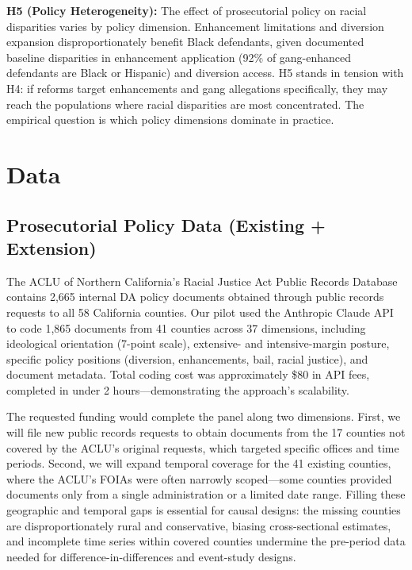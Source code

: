 \documentclass[12pt]{article}
\begin{document}
\textbf{H5 (Policy Heterogeneity):} The effect of prosecutorial policy on racial disparities varies by policy dimension. Enhancement limitations and diversion expansion disproportionately benefit Black defendants, given documented baseline disparities in enhancement application (92\% of gang-enhanced defendants are Black or Hispanic) and diversion access. H5 stands in tension with H4: if reforms target enhancements and gang allegations specifically, they may reach the populations where racial disparities are most concentrated. The empirical question is which policy dimensions dominate in practice.

\section{Data}

\subsection{Prosecutorial Policy Data (Existing + Extension)}

The ACLU of Northern California's Racial Justice Act Public Records Database contains 2,665 internal DA policy documents obtained through public records requests to all 58 California counties. Our pilot used the Anthropic Claude API to code 1,865 documents from 41 counties across 37 dimensions, including ideological orientation (7-point scale), extensive- and intensive-margin posture, specific policy positions (diversion, enhancements, bail, racial justice), and document metadata. Total coding cost was approximately \$80 in API fees, completed in under 2 hours---demonstrating the approach's scalability.

The requested funding would complete the panel along two dimensions. First, we will file new public records requests to obtain documents from the 17 counties not covered by the ACLU's original requests, which targeted specific offices and time periods. Second, we will expand temporal coverage for the 41 existing counties, where the ACLU's FOIAs were often narrowly scoped---some counties provided documents only from a single administration or a limited date range. Filling these geographic and temporal gaps is essential for causal designs: the missing counties are disproportionately rural and conservative, biasing cross-sectional estimates, and incomplete time series within covered counties undermine the pre-period data needed for difference-in-differences and event-study designs.
\end{document}

